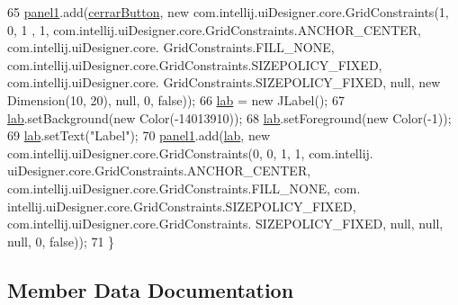 \begin{DoxyCode}
65         \hyperlink{classpresentacion_1_1form_1_1PopUp__Estadistica_ac276266d42b873f89883dd3a869feadf}{panel1}.add(\hyperlink{classpresentacion_1_1form_1_1PopUp__Estadistica_aad708c3569f3d964b09867708ba60bf6}{cerrarButton}, \textcolor{keyword}{new} com.intellij.uiDesigner.core.GridConstraints(1, 0, 1
      , 1, com.intellij.uiDesigner.core.GridConstraints.ANCHOR\_CENTER, com.intellij.uiDesigner.core.
      GridConstraints.FILL\_NONE, com.intellij.uiDesigner.core.GridConstraints.SIZEPOLICY\_FIXED, com.intellij.uiDesigner.core.
      GridConstraints.SIZEPOLICY\_FIXED, null, \textcolor{keyword}{new} Dimension(10, 20), null, 0, \textcolor{keyword}{false}));
66         \hyperlink{classpresentacion_1_1form_1_1PopUp__Estadistica_ac61ead9dea9a28c411062fdc951b4df8}{lab} = \textcolor{keyword}{new} JLabel();
67         \hyperlink{classpresentacion_1_1form_1_1PopUp__Estadistica_ac61ead9dea9a28c411062fdc951b4df8}{lab}.setBackground(\textcolor{keyword}{new} Color(-14013910));
68         \hyperlink{classpresentacion_1_1form_1_1PopUp__Estadistica_ac61ead9dea9a28c411062fdc951b4df8}{lab}.setForeground(\textcolor{keyword}{new} Color(-1));
69         \hyperlink{classpresentacion_1_1form_1_1PopUp__Estadistica_ac61ead9dea9a28c411062fdc951b4df8}{lab}.setText(\textcolor{stringliteral}{"Label"});
70         \hyperlink{classpresentacion_1_1form_1_1PopUp__Estadistica_ac276266d42b873f89883dd3a869feadf}{panel1}.add(\hyperlink{classpresentacion_1_1form_1_1PopUp__Estadistica_ac61ead9dea9a28c411062fdc951b4df8}{lab}, \textcolor{keyword}{new} com.intellij.uiDesigner.core.GridConstraints(0, 0, 1, 1, com.intellij.
      uiDesigner.core.GridConstraints.ANCHOR\_CENTER, com.intellij.uiDesigner.core.GridConstraints.FILL\_NONE, com.
      intellij.uiDesigner.core.GridConstraints.SIZEPOLICY\_FIXED, com.intellij.uiDesigner.core.GridConstraints.
      SIZEPOLICY\_FIXED, null, null, null, 0, \textcolor{keyword}{false}));
71     \}
\end{DoxyCode}


\subsection{Member Data Documentation}
\mbox{\label{classpresentacion_1_1form_1_1PopUp__Estadistica_aad708c3569f3d964b09867708ba60bf6}} 
